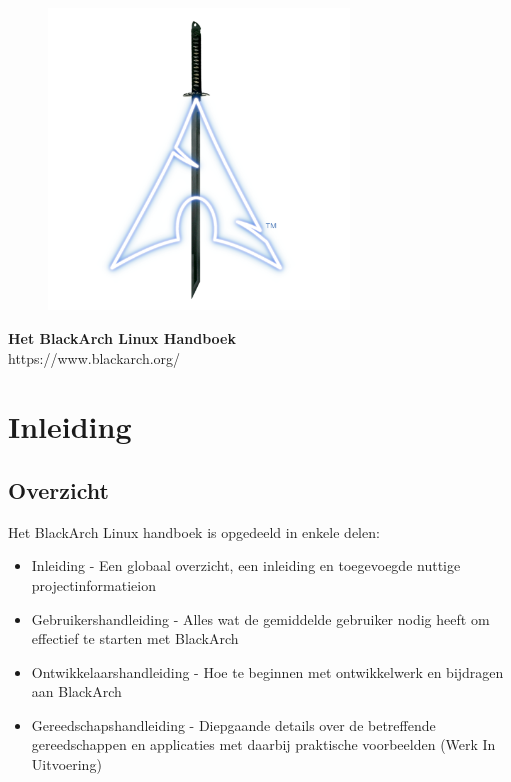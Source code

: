 \documentclass[a4paper, oneside, 11pt]{book}
\begin{document}
\pagestyle{empty}
\begin{center}
\begin{figure}[htbp]
\centering
\vspace{0.5cm}
\includegraphics[width=8cm]{images/logo.png}
\label{fig:logo}
\end{figure}
\vspace{0.5cm}
\Huge{\textbf{Het BlackArch Linux Handboek}}\\
\vspace{1cm}
\Large{\color{blue}https://www.blackarch.org/}\\
\vspace{0.5cm}
\end{center}
\newpage
\tableofcontents
\newpage
\pagestyle{fancy}


\chapter{Inleiding}

\section{Overzicht}
Het BlackArch Linux handboek is opgedeeld in enkele delen:
\begin{itemize}
\item Inleiding - Een globaal overzicht, een inleiding en toegevoegde nuttige projectinformatieion
\item Gebruikershandleiding - Alles wat de gemiddelde gebruiker nodig heeft om effectief te starten met BlackArch
\item Ontwikkelaarshandleiding - Hoe te beginnen met ontwikkelwerk en bijdragen aan BlackArch
\item Gereedschapshandleiding - Diepgaande details over de betreffende gereedschappen en applicaties met daarbij praktische voorbeelden (Werk In Uitvoering)
\end{itemize}
\end{document}
